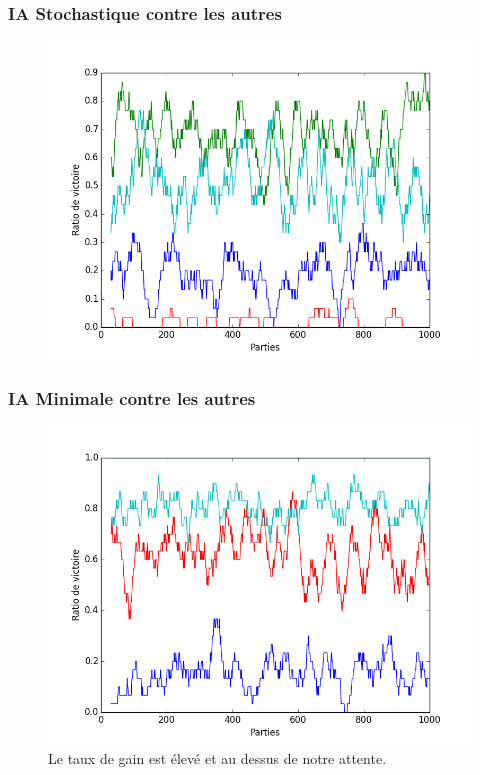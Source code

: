 \documentclass{beamer}
\begin{document}
\begin{frame}
  \frametitle{IA Stochastique contre les autres}

  \begin{figure}
    \includegraphics[scale=0.4]{plot/ivre}
  \end{figure}
\end{frame}

\begin{frame}
  \frametitle{IA Minimale contre les autres}
  \begin{figure}
    \includegraphics[scale=0.4]{plot/debile}
    \caption{
      \label{fig_debile} Le taux de gain est élevé et au dessus de notre attente.
    }
  \end{figure}
\end{frame}
\end{document}
